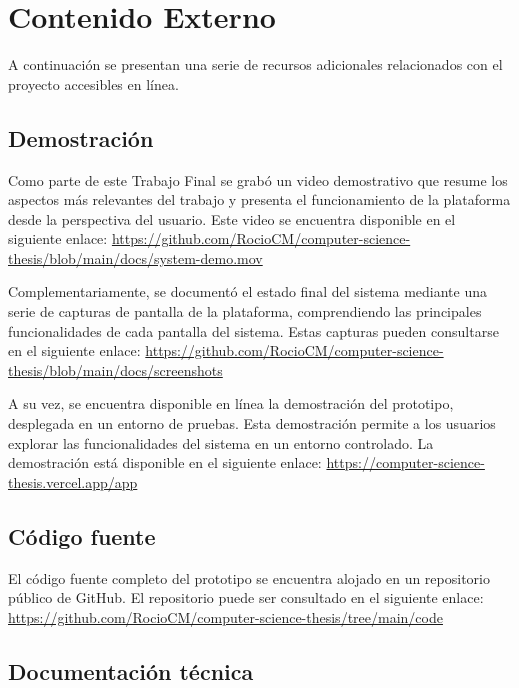 \chapter[Contenido externo]{Contenido Externo}
\label{cp:annex-content}

\parindent0pt

A continuación se presentan una serie de recursos adicionales relacionados con el proyecto accesibles en línea.

\section{Demostración}
\label{sec:results-demo}

Como parte de este Trabajo Final se grabó un video demostrativo que resume los aspectos más relevantes del trabajo y presenta el funcionamiento de la plataforma desde la perspectiva del usuario. Este video se encuentra disponible en el siguiente enlace: 
\url{https://github.com/RocioCM/computer-science-thesis/blob/main/docs/system-demo.mov} %

Complementariamente, se documentó el estado final del sistema mediante una serie de capturas de pantalla de la plataforma, comprendiendo las principales funcionalidades de cada pantalla del sistema. Estas capturas pueden consultarse en el siguiente enlace: \url{https://github.com/RocioCM/computer-science-thesis/blob/main/docs/screenshots} %

A su vez, se encuentra disponible en línea la demostración del prototipo, desplegada en un entorno de pruebas. Esta demostración permite a los usuarios explorar las funcionalidades del sistema en un entorno controlado. La demostración está disponible en el siguiente enlace: \url{https://computer-science-thesis.vercel.app/app}

\section{Código fuente}
\label{sec:source-code}

El código fuente completo del prototipo se encuentra alojado en un repositorio público de GitHub. El repositorio puede ser consultado en el siguiente enlace: \url{https://github.com/RocioCM/computer-science-thesis/tree/main/code}

\section{Documentación técnica}
\label{sec:technical-docs}

